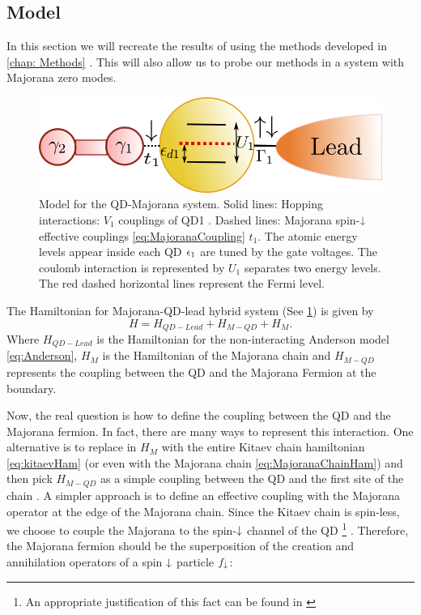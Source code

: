 \subsection{Model}

In this section we will recreate the results of \citeauthor{liu_detecting_2011} using the methods developed in \ref{chap: Methods} . This will also allow us to probe our methods in a system with Majorana zero modes. 

\begin{figure}[t]
\centering
\includegraphics[scale=0.6]{IMAGES/Majorana/QD-M.png}
\caption{\label{fig:ModelM-QD} Model for the QD-Majorana system. Solid lines: Hopping interactions: $V_1$ couplings of QD1 . Dashed lines: Majorana spin-$\downarrow$ effective couplings \eqref{eq:MajoranaCoupling} $t_1$. The atomic energy levels appear inside each QD $\epsilon_1$ are tuned by the gate voltages. The coulomb interaction is represented by $U_1$ separates two energy levels.  The red dashed horizontal lines represent the Fermi level. }
\end{figure}

The Hamiltonian for Majorana-QD-lead hybrid system (See \ref{fig:ModelM-QD}) is  given by
\begin{equation}
    H=H_{QD-Lead}+H_{M-QD}+H_M.
\end{equation}
Where $H_{QD-Lead}$ is the Hamiltonian for the non-interacting Anderson model \eqref{eq:Anderson}, $H_M$ is the Hamiltonian of the Majorana chain and $H_{M-QD}$ represents the coupling between the QD and the Majorana Fermion at the boundary.

Now, the real question is how to define the coupling between the QD and the Majorana fermion. In fact, there are many ways to represent this interaction. One alternative is to replace in $H_{M}$ with the entire Kitaev chain hamiltonian \eqref{eq:kitaevHam} (or  even with the  Majorana chain \eqref{eq:MajoranaChainHam}) and then pick $H_{M-QD}$ as a simple coupling between the QD and the first site of the chain \cite{vernek_subtle_2014}.  A simpler approach is  to define an effective coupling with the Majorana operator at the edge of the Majorana chain. Since the Kitaev chain is spin-less, we choose to couple the Majorana to the spin-$\downarrow$ channel of the QD \footnote{An appropriate justification of this fact can be found in \cite{ruiz-tijerina_interaction_2015}} . Therefore, the Majorana fermion should be the superposition of the creation and annihilation operators of a spin $\downarrow$ particle $f_\downarrow$:


